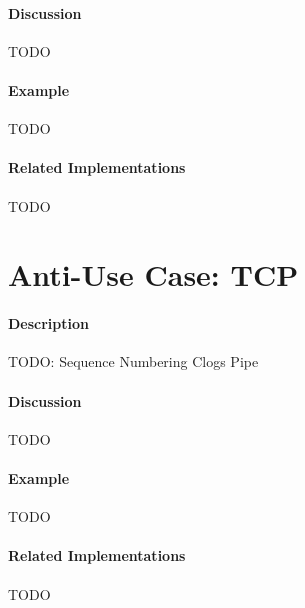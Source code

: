 \paragraph{Discussion}

{\Large TODO}

\paragraph{Example}

{\Large TODO}

\paragraph{Related Implementations}

{\Large TODO}

\section{Anti-Use Case: TCP}

\paragraph{Description}

{\Large TODO:} Sequence Numbering Clogs Pipe

\paragraph{Discussion}

{\Large TODO}

\paragraph{Example}

{\Large TODO}

\paragraph{Related Implementations}

{\Large TODO}
